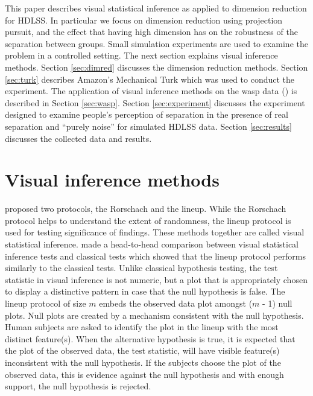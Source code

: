 This paper describes visual statistical inference as applied to dimension reduction for HDLSS. In particular we focus on dimension reduction using projection pursuit, and the effect that having high dimension has on the robustness of the separation between groups.  Small simulation experiments are used to examine the problem in a controlled setting. The next section explains visual inference methods. Section \ref{sec:dimred} discusses the dimension reduction methods. Section \ref{sec:turk} describes Amazon's Mechanical Turk  \citep{turk}  which was used to conduct the experiment. The application of visual inference methods on the wasp data (\cite{toth:2010}) is described in Section \ref{sec:wasp}. Section \ref{sec:experiment} discusses the experiment designed to examine people's perception of separation in the presence of real separation and ``purely noise'' for simulated HDLSS data. Section \ref{sec:results} discusses the collected data and results. 


\section{Visual inference methods} \label{sec:inference}

\cite{buja:2009} proposed two protocols, the Rorschach and the lineup. While the Rorschach protocol helps to understand the extent of randomness, the lineup protocol is  used for testing significance of findings. These methods together are called visual statistical inference. \cite{majumder:2013} made a head-to-head comparison between visual statistical inference tests and classical tests which showed that the lineup protocol performs similarly to the classical tests. Unlike classical hypothesis testing, the test statistic in visual inference is not numeric, but a plot that is appropriately chosen to display a  distinctive pattern in case that the null hypothesis is false. The lineup protocol of size $m$ embeds the observed data plot amongst ($m$ - 1) null plots. Null plots are created by a mechanism consistent with the null hypothesis. Human subjects are asked to identify the plot in the lineup with the most distinct feature(s). When the alternative hypothesis is true, it is expected that the plot of the observed data, the test statistic, will have visible feature(s) inconsistent with the null hypothesis. If the subjects choose the plot of the observed data, this is evidence against the null hypothesis and with enough support, the null hypothesis is rejected. 

